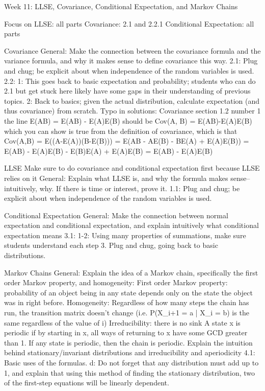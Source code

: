 Week 11: LLSE, Covariance, Conditional Expectation, and Markov Chains

Focus on
LLSE: all parts
Covariance: 2.1 and 2.2.1
Conditional Expectation: all parts

Covariance
General: Make the connection between the covariance formula and the variance formula, and why it makes sense to define covariance this way.
2.1: Plug and chug; be explicit about when independence of the random variables is used.
2.2:
	1: This goes back to basic expectation and probability; students who can do 2.1 but get stuck here likely have some gaps in their understanding of previous topics.
	2: Back to basics; given the actual distribution, calculate expectation (and thus covariance) from scratch.
Typo in solutions: Covariance section 1.2 number 1 the line E(AB) = E(AB) - E(A)E(B) should be Cov(A, B) = E(AB)-E(A)E(B) which you can show is true from the definition of covariance, which is that Cov(A,B) = E((A-E(A))(B-E(B))) 
= E(AB - AE(B) - BE(A) + E(A)E(B)) 
= E(AB) - E(A)E(B) - E(B)E(A) + E(A)E(B) 
= E(AB) - E(A)E(B)

LLSE
Make sure to do covariance and conditional expectation first because LLSE relies on it
General: Explain what LLSE is, and why the formula makes sense--intuitively, why. If there is time or interest, prove it.
1.1: Plug and chug; be explicit about when independence of the random variables is used.


Conditional Expectation
General: Make the connection between normal expectation and conditional expectation, and explain intuitively what conditional expectation means
3.1: 
	1-2: Using many properties of summations, make sure students understand each step
	3. Plug and chug, going back to basic distributions.

Markov Chains
General: Explain the idea of a Markov chain, specifically the first order Markov property, and homogeneity:
	First order Markov property: probability of an object being in any state depends only on the state the object was in right before.
	Homogeneity: Regardless of how many steps the chain has run, the transition matrix doesn’t change (i.e. P(X_{i+1} = a | X_{i} = b) is the same regardless of the value of i)
	Irreducibility: there is no sink
	A state x is periodic if by starting in x, all ways of returning to x have some GCD greater than 1. If any state is periodic, then the chain is periodic.
	Explain the intuition behind stationary/invariant distributions and irreducibility and aperiodicity
4.1: Basic uses of the formulas.
	d: Do not forget that any distribution must add up to 1, and explain that using this method of finding the stationary distribution, two of the first-step equations will be linearly dependent.

